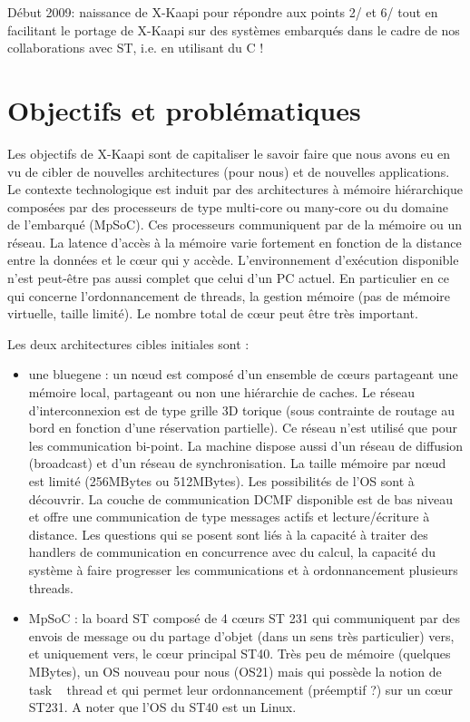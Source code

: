 \documentclass{report}
\begin{document}
Début 2009: naissance de X-Kaapi pour répondre aux points 2/ et 6/ tout en facilitant le portage de X-Kaapi sur des systèmes embarqués dans le cadre de nos collaborations avec ST, i.e. en utilisant du C !



\newpage
\section{Objectifs et problématiques}
Les objectifs de X-Kaapi sont de capitaliser le savoir faire que nous avons eu en vu de cibler de nouvelles architectures (pour nous) et de nouvelles applications.
Le contexte technologique est induit par des architectures à mémoire hiérarchique composées par des processeurs de type multi-core ou many-core ou du domaine de l'embarqué (MpSoC). Ces processeurs communiquent par de la mémoire ou un réseau. La latence d'accès à la mémoire varie fortement en fonction de la distance entre la données et le cœur qui y accède. L'environnement d'exécution disponible n'est peut-être pas aussi complet que celui d'un PC actuel. En particulier en ce qui concerne l'ordonnancement de threads, la gestion mémoire (pas de mémoire virtuelle, taille limité). Le nombre total de cœur peut être très important.

Les deux architectures cibles initiales sont :
\begin{itemize}
\item une bluegene : un nœud est composé d'un ensemble de cœurs partageant une mémoire local, partageant ou non une hiérarchie de caches. Le réseau d'interconnexion est de type grille 3D torique (sous contrainte de routage au bord en fonction d'une réservation partielle). Ce réseau n'est utilisé que pour les communication bi-point. La machine dispose aussi d'un réseau de diffusion (broadcast) et d'un réseau de synchronisation. La taille mémoire par nœud est limité (256MBytes ou 512MBytes). Les possibilités de l'OS sont à découvrir. La couche de communication DCMF disponible est de bas niveau et offre une communication de type messages actifs et lecture/écriture à distance. Les questions qui se posent sont liés à la capacité à traiter des handlers de communication en concurrence avec du calcul, la capacité du système à faire progresser les communications et à ordonnancement plusieurs threads.
\item MpSoC : la board ST composé de 4 cœurs ST 231 qui communiquent par des envois de message ou du partage d'objet (dans un sens très particulier) vers, et uniquement vers, le cœur principal ST40. Très peu de mémoire (quelques MBytes), un OS nouveau pour nous (OS21) mais qui possède la notion de task ~ thread et qui permet leur ordonnancement (préemptif ?) sur un cœur ST231. A noter que l'OS du ST40 est un Linux.
\end{itemize}
\end{document}

